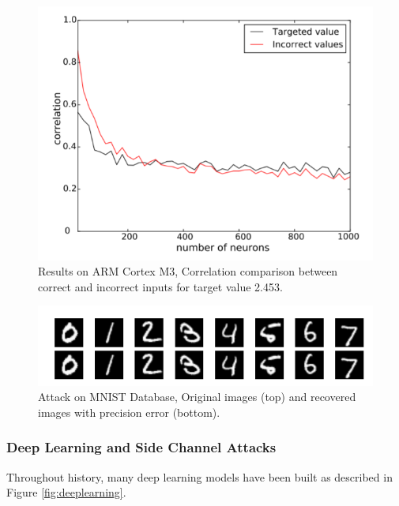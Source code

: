 \begin{figure}
    \centering
    \includegraphics[scale=0.5]{images/chapter8/results2.PNG}
    \caption{ Results on ARM Cortex M3,
Correlation comparison between correct and incorrect inputs for target value
2.453.}
\end{figure}

\begin{figure}
    \centering
    \includegraphics[scale=0.5]{images/chapter8/letters.PNG}
    \caption{ Attack on MNIST Database, Original images (top) and recovered images with precision error (bottom).}
\end{figure}

\subsubsection{Deep Learning and Side Channel Attacks}
Throughout history, many deep learning models have been built as described in Figure \ref{fig:deeplearning}.

